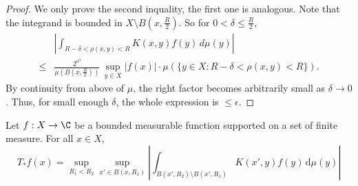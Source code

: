 \begin{proof}
We only prove the second inquality, the first one is analogous.
Note that the integrand is bounded in $X\setminus B(x,\frac{R}{2})$. So for $0<\delta\le\frac{R}{2}$,
\begin{align*}
    &\left| \int_{R-\delta<\rho(x,y)<R} K(x,y) f(y) \, d\mu(y) \right| \\
    \le &\frac{2^{a^3}}{\mu(B(x,\frac{R}{2}))} \, \sup_{y\in X}|f(x)| \cdot \mu(\{y\in X: R-\delta<\rho(x,y)<R\}).
\end{align*}
By continuity from above of $\mu$, the right factor becomes arbitrarily small as $\delta\rightarrow 0$. Thus, for small enough $\delta$, the whole expression is $\le\epsilon$.
\end{proof}

\begin{lemma}
    \label{nontangential-operator-boundary}
    \leanok
    Let $f:X\to\C$ be a bounded measurable function supported on a set of finite measure.
    For all $x\in X$,
    \begin{equation}
    \label{tang-unm-op-eq}
        T_*f(x) = \sup_{R_1 < R_2} \sup_{x'\in B(x,R_1)} \left|\int_{B(x',R_2)\setminus B(x',R_1)} K(x',y) f(y) \, \mathrm{d}\mu(y) \right|
    \end{equation}
\end{lemma}
